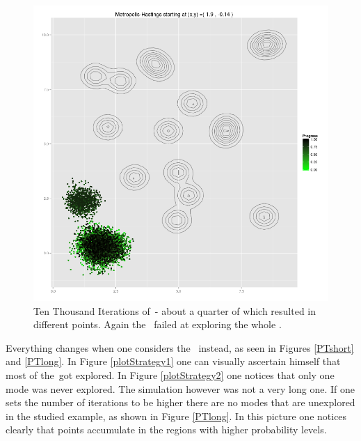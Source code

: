 \documentclass{book}
\begin{document}
\begin{figure}[ht]
	\centering 
	\includegraphics[width=.5\textwidth,keepaspectratio]{./img/MH_simululation_10000_steps.png}
	\caption[]{Ten Thousand Iterations of \MH\,- about a quarter of which resulted in different points. Again the \MH\, failed at exploring the whole \sspace.}\label{unexploredLong}
\end{figure}


Everything changes when one considers the \PT\, instead, as seen in Figures \ref{PTshort} and \ref{PTlong}. In Figure \ref{plotStrategy1} one can visually ascertain himself that most of the \sspace\,got explored. In Figure \ref{plotStrategy2} one notices that only one mode was never explored. The simulation however was not a very long one. If one sets the number of iterations to be higher there are no modes that are unexplored in the studied example, as shown in Figure \ref{PTlong}. In this picture one notices clearly that points accumulate in the regions with higher probability levels.  
\end{document}
